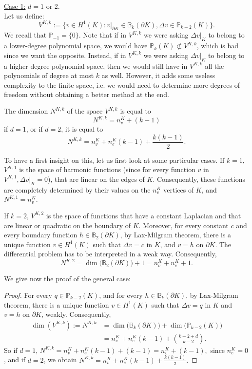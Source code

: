 \noindent \underline{Case 1:} $d=1$ or $2$. \\
\noindent Let us define:
$$ V^{K,k} := \Big\{ v\in H^1(K) : v|_{\partial K} \in \mathbb{B}_k(\partial K), \Delta v \in \mathbb{P}_{k-2}(K)\Big\}.$$
We recall that $\mathbb{P}_{-1} = \{0\}$. Note that if in $V^{K,k}$ we were asking $\Delta v|_K$ to belong to a lower-degree polynomial space, we would have $\mathbb{P}_k(K)\not\subset V^{K,k}$, which is bad since we want the opposite. Instead, if in $V^{K,k}$ we were asking $\Delta v|_K$ to belong to a higher-degree polynomial space, then we would still have in $V^{K,k}$ all the polynomials of degree at most $k$ as well. However, it adds some useless complexity to the finite space, i.e. we would need to determine more degrees of freedom without obtaining a better method at the end.

\begin{proposition} \label{dimVKkd12}
The dimension $N^{K,k}$ of the space $V^{K,k}$ is equal to $$N^{K,k} = n_v^K +(k-1)$$ if $d=1$, or if $d=2$, it is equal to $$N^{K,k} = n_v^K + n_e^K(k-1) + \frac{k(k-1)}{2}.$$
\end{proposition}
To have a first insight on this, let us first look at some particular cases. If $k=1$, $V^{K,1}$ is the space of harmonic functions (since for every function $v$ in $V^{K,1}, \Delta v|_K = 0$), that are linear on the edges of $K$. Consequently, these functions are completely determined by their values on the $n_v^K$ vertices of $K$, and $N^{K,1} = n_v^K$. 

If $k=2$, $V^{K,2}$ is the space of functions that have a constant Laplacian and that are linear or quadratic on the boundary of $K$. Moreover, for every constant $c$ and every boundary function $h\in \mathbb{B}_2(\partial K)$, by Lax-Milgram theorem, there is a unique function $v\in H^1(K)$ such that $\Delta v = c$ in $K$, and $v = h$ on $\partial K$. The differential problem has to be interpreted in a weak way. Consequently, $$N^{K,2} = \dim\big(\mathbb{B}_2(\partial K)\big)+1 = n_v^K + n_e^K+1.$$

We give now the proof of the general case:
\begin{proof}
For every $q\in \mathbb{P}_{k-2}(K)$, and for every $h\in \mathbb{B}_k(\partial K)$, by Lax-Milgram theorem, there is a unique function $v\in H^1(K)$ such that $\Delta v = q$ in $K$ and $v = h$ on $\partial K$, weakly. Consequently, 
\begin{align*}\dim\left(V^{K,k}\right) := N^{K,k} &= \dim\big(\mathbb{B}_k\left(\partial K\right)\big)+\dim\big(\mathbb{P}_{k-2}(K)\big)\\
&= n_v^K + n_e^K(k-1) + \binom{k-2+d}{k-2}.
\end{align*}
So if $d=1$, 
$N^{K,k} = n_v^K + n_e^K(k-1) + (k-1) = n_v^K + (k-1),$ since $n_e^K=0$, and if $d=2$, we obtain $N^{K,k} = n_v^K + n_e^K(k-1) + \frac{k(k-1)}{2}.$
\end{proof}

